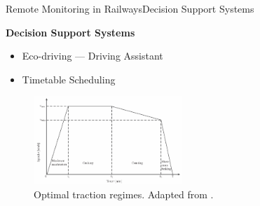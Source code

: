 \begin{frame}{Remote Monitoring in Railways}{Decision Support Systems}
\begin{block}{\textbf{Decision Support Systems}}
	
	\begin{minipage}[t]{0.48\linewidth}
		\begin{itemize}
			\item Eco-driving --- Driving Assistant
			\item Timetable Scheduling
		\end{itemize}
	\end{minipage}\hfill
	\begin{minipage}[t]{0.48\linewidth}
		
		\begin{figure}[ht!]
			\centering
			\includegraphics[width=0.5\textwidth,keepaspectratio]{figures/35.DSS/scheepmaker2017a}
			\caption{Optimal traction regimes. Adapted from \cite{scheepmaker2017}.}
		\end{figure}
		
	\end{minipage}

\end{block}
\end{frame}





	
			

